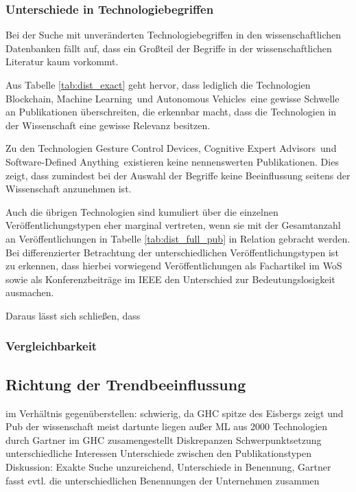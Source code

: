 \subsubsection{Unterschiede in Technologiebegriffen}
Bei der Suche mit unveränderten Technologiebegriffen in den wissenschaftlichen Datenbanken fällt auf, dass ein Großteil der Begriffe in der wissenschaftlichen Literatur kaum vorkommt.

Aus Tabelle \ref{tab:dist_exact} geht hervor, dass lediglich die Technologien \glqq Blockchain\grqq, \glqq Machine Learning\grqq~und \glqq Autonomous Vehicles\grqq~eine gewisse Schwelle an Publikationen überschreiten, die erkennbar macht, dass die Technologien in der Wissenschaft eine gewisse Relevanz besitzen.

Zu den Technologien \glqq Gesture Control Devices\grqq, \glqq Cognitive Expert Advisors\grqq~und \glqq Software-Defined Anything\grqq~existieren keine nennenswerten Publikationen. Dies zeigt, dass zumindest bei der Auswahl der Begriffe keine Beeinflussung seitens der Wissenschaft anzunehmen ist.

Auch die übrigen Technologien sind kumuliert über die einzelnen Ver\-öf\-fent\-lich\-ungs\-typen eher marginal vertreten, wenn sie mit der Gesamtanzahl an Veröffentlichungen in Tabelle \ref{tab:dist_full_pub} in Relation gebracht werden. Bei differenzierter Betrachtung der unterschiedlichen Veröffentlichungstypen ist zu erkennen, dass hierbei vorwiegend Veröffentlichungen als Fachartikel im \ac{WoS} sowie als Konferenzbeiträge im \ac{IEEE} den Unterschied zur Bedeutungslosigkeit ausmachen.

Daraus lässt sich schließen, dass
\subsubsection{Vergleichbarkeit}

\subsection{Richtung der Trendbeeinflussung}

im Verhältnis gegenüberstellen: schwierig, da GHC spitze des Eisbergs zeigt und Pub der wissenschaft meist dartunte liegen außer ML
aus 2000 Technologien durch Gartner im GHC zusamengestellt
Diskrepanzen Schwerpunktsetzung
unterschiedliche Interessen
Unterschiede zwischen den Publikationstypen
Diskussion:
Exakte Suche unzureichend, Unterschiede in Benennung, Gartner fasst evtl. die unterschiedlichen Benennungen der Unternehmen zusammen

